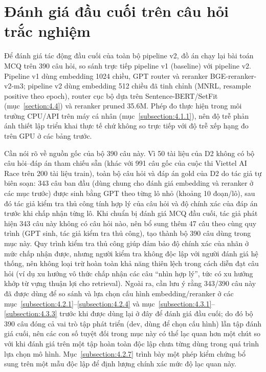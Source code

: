 \documentclass[../DoAn.tex]{subfiles}
\begin{document}
\section{Đánh giá đầu cuối trên câu hỏi trắc nghiệm}
\label{section:4.3}
\label{subsection:4.2.5}

Để đánh giá tác động đầu cuối của toàn bộ pipeline v2, đồ án chạy lại bài toán MCQ trên 390 câu hỏi, so sánh trực tiếp pipeline v1 (baseline) với pipeline v2. Pipeline v1 dùng embedding 1024 chiều, GPT router và reranker BGE-reranker-v2-m3; pipeline v2 dùng embedding 512 chiều đã tinh chỉnh (MNRL, resample positive theo epoch), router cục bộ dựa trên Sentence-BERT/SetFit (mục~\ref{section:4.4}) và reranker pruned 35.6M. Phép đo thực hiện trong môi trường CPU/API trên máy cá nhân (mục~\ref{subsection:4.1.1}), nên độ trễ phản ánh thiết lập triển khai thực tế chứ không so trực tiếp với độ trễ xếp hạng đo trên GPU ở các bảng trước.

Cần nói rõ về nguồn gốc của bộ 390 câu này. Vì 50 tài liệu của D2 không có bộ câu hỏi--đáp án tham chiếu sẵn (khác với 991 câu gốc của cuộc thi Viettel AI Race trên 200 tài liệu train), toàn bộ câu hỏi và đáp án gold của D2 do tác giả tự biên soạn: 343 câu ban đầu (dùng chung cho đánh giá embedding và reranker ở các mục trước) được sinh bằng GPT theo từng lô nhỏ (khoảng 10 đoạn/lô), sau đó tác giả kiểm tra thủ công tính hợp lý của câu hỏi và độ chính xác của đáp án trước khi chấp nhận từng lô. Khi chuẩn bị đánh giá MCQ đầu cuối, tác giả phát hiện 343 câu này không có câu hỏi  nào, nên bổ sung thêm 47 câu  theo cùng quy trình (GPT sinh, tác giả kiểm tra thủ công), tạo thành bộ 390 câu dùng trong mục này. Quy trình kiểm tra thủ công giúp đảm bảo độ chính xác của nhãn ở mức chấp nhận được, nhưng người kiểm tra không độc lập với người đánh giá hệ thống, nên không loại trừ hoàn toàn khả năng thiên lệch trong cách diễn đạt câu hỏi (ví dụ xu hướng vô thức chấp nhận các câu ``nhìn hợp lý'', tức có xu hướng khớp từ vựng thuận lợi cho retrieval). Ngoài ra, cần lưu ý rằng 343/390 câu này đã được dùng để so sánh và lựa chọn cấu hình embedding/reranker ở các mục~\ref{subsection:4.2.1}--\ref{subsection:4.2.4} và mục~\ref{subsection:4.3.1}--\ref{subsection:4.3.3} trước khi được dùng lại ở đây để đánh giá đầu cuối; do đó bộ 390 câu đóng cả vai trò tập phát triển (dev, dùng để chọn cấu hình) lẫn tập đánh giá cuối, nên các con số tuyệt đối trong mục này có thể lạc quan hơn một chút so với khi đánh giá trên một tập hoàn toàn độc lập chưa từng dùng trong quá trình lựa chọn mô hình. Mục~\ref{subsection:4.2.7} trình bày một phép kiểm chứng bổ sung trên một mẫu độc lập để định lượng chính xác mức độ lạc quan này.
\end{document}
